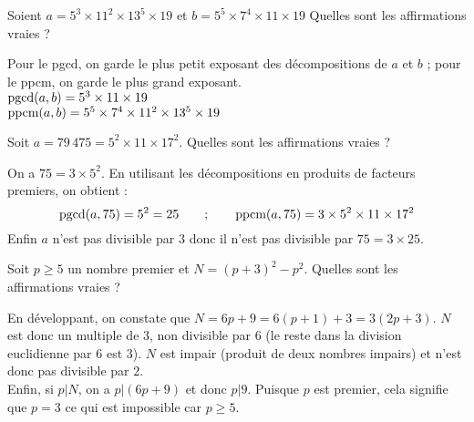 \begin{question}
    Soient $a = 5^3 \times 11^2 \times 13^5 \times 19$ 
    et $b = 5^5 \times 7^4 \times 11 \times 19$  
    Quelles sont les affirmations vraies ?
    \begin{answers} 
    \end{answers}
    \begin{explanations}
    Pour le pgcd, on garde le plus petit exposant des décompositions de $a$ et $b$ ; pour le ppcm, on garde le plus grand exposant. \\
     $\mathop{\text{pgcd}}(a,b) = 5^3 \times 11 \times 19$ \\         
     $\mathop{\text{ppcm}}(a,b) = 5^5 \times 7^4 \times 11^2 \times 13^5 \times 19$   
    \end{explanations}
\end{question}


\begin{question}
 Soit $a = 79 \, 475 = 5^2 \times 11 \times 17^2$. Quelles sont les affirmations vraies ?
    \begin{answers} 
    \end{answers}
    \begin{explanations} 
    On a $75 = 3 \times 5^2$. En utilisant les décompositions en produits de facteurs premiers, on obtient :
    $$ \mathop{\text{pgcd}}(a,75) = 5^2 = 25 \qquad ; \qquad \mathop{\text{ppcm}}(a,75) = 3 \times 5^2 \times 11 \times 17^2$$
    Enfin $a$ n'est pas divisible par $3$ donc il n'est pas divisible par $75 = 3 \times 25$.
    \end{explanations}
\end{question}



\begin{question}
 Soit $p \geq 5$ un nombre premier et $N = (p+3)^2 - p^2$. Quelles sont les affirmations vraies ?
    \begin{answers} 
    \end{answers}
    \begin{explanations} 
    En développant, on constate que $N = 6p+9 = 6(p+1)+3 =  3(2p+3)$. $N$ est donc un multiple de $3$, non divisible par $6$ (le reste dans la division euclidienne par $6$ est $3$). $N$ est impair (produit de deux nombres impairs) et n'est donc pas divisible par $2$.\\
    Enfin, si $p|N$, on a $p | (6p+9)$ et donc $p|9$. Puisque $p$ est premier, cela signifie que $p=3$ ce qui est impossible car $p \geq 5$.
    \end{explanations}
\end{question}


